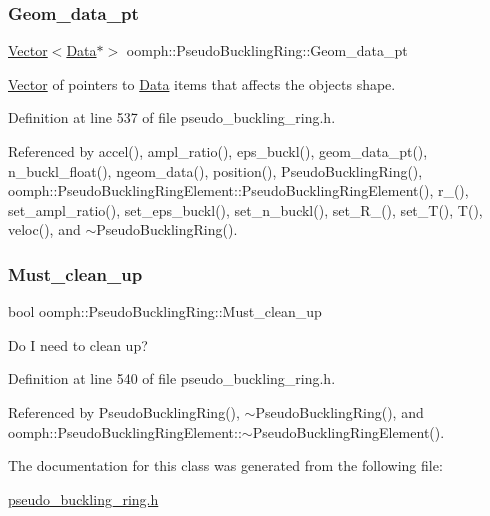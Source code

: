 \subsubsection{\texorpdfstring{Geom\+\_\+data\+\_\+pt}{Geom\_data\_pt}}
{\footnotesize\ttfamily \hyperlink{classoomph_1_1Vector}{Vector}$<$\hyperlink{classoomph_1_1Data}{Data}$\ast$$>$ oomph\+::\+Pseudo\+Buckling\+Ring\+::\+Geom\+\_\+data\+\_\+pt\hspace{0.3cm}{\ttfamily [protected]}}



\hyperlink{classoomph_1_1Vector}{Vector} of pointers to \hyperlink{classoomph_1_1Data}{Data} items that affects the object\textquotesingle{}s shape. 



Definition at line 537 of file pseudo\+\_\+buckling\+\_\+ring.\+h.



Referenced by accel(), ampl\+\_\+ratio(), eps\+\_\+buckl(), geom\+\_\+data\+\_\+pt(), n\+\_\+buckl\+\_\+float(), ngeom\+\_\+data(), position(), Pseudo\+Buckling\+Ring(), oomph\+::\+Pseudo\+Buckling\+Ring\+Element\+::\+Pseudo\+Buckling\+Ring\+Element(), r\+\_(), set\+\_\+ampl\+\_\+ratio(), set\+\_\+eps\+\_\+buckl(), set\+\_\+n\+\_\+buckl(), set\+\_\+\+R\+\_(), set\+\_\+\+T(), T(), veloc(), and $\sim$\+Pseudo\+Buckling\+Ring().

\mbox{\label{classoomph_1_1PseudoBucklingRing_a37b25eb9891d9811158a11b8e8802542}} 
\subsubsection{\texorpdfstring{Must\+\_\+clean\+\_\+up}{Must\_clean\_up}}
{\footnotesize\ttfamily bool oomph\+::\+Pseudo\+Buckling\+Ring\+::\+Must\+\_\+clean\+\_\+up\hspace{0.3cm}{\ttfamily [protected]}}



Do I need to clean up? 



Definition at line 540 of file pseudo\+\_\+buckling\+\_\+ring.\+h.



Referenced by Pseudo\+Buckling\+Ring(), $\sim$\+Pseudo\+Buckling\+Ring(), and oomph\+::\+Pseudo\+Buckling\+Ring\+Element\+::$\sim$\+Pseudo\+Buckling\+Ring\+Element().



The documentation for this class was generated from the following file\+:\begin{DoxyCompactItemize}
\item 
\hyperlink{pseudo__buckling__ring_8h}{pseudo\+\_\+buckling\+\_\+ring.\+h}\end{DoxyCompactItemize}
